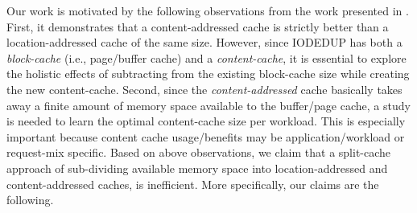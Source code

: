 Our work is motivated by the following observations from the work
presented in \cite{iodedup}.
First, it demonstrates that a content-addressed cache
is strictly better than a location-addressed cache of the same size. However, since
IODEDUP has both a \textit{block-cache} (i.e., page/buffer cache)
and a \textit{content-cache}, it is
essential to explore the holistic effects of subtracting from the existing
block-cache size while creating the new content-cache.
Second, since the \textit{content-addressed} cache
basically takes away a finite amount of memory space available
to the buffer/page cache, a study is needed to learn the
optimal content-cache size per workload. This is especially important
because content cache usage/benefits may be application/workload
or request-mix specific.
Based on above observations, we claim
that a split-cache approach of sub-dividing available
memory space into location-addressed and content-addressed caches, is inefficient.
More specifically, our claims are the following.
